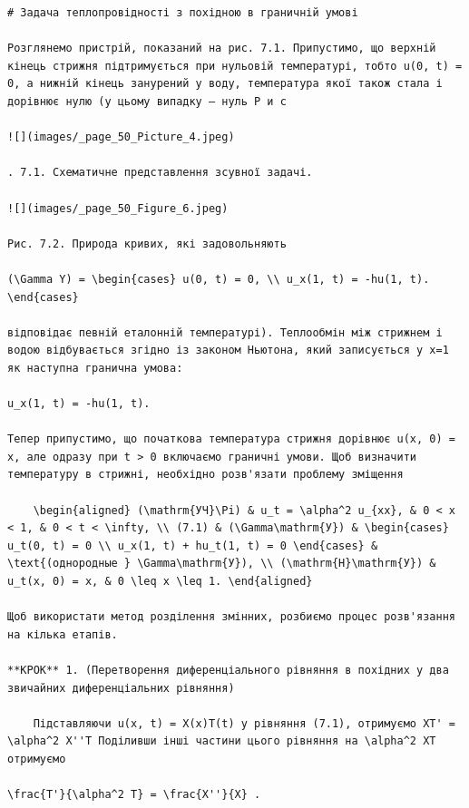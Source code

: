 \documentclass[
  ukrainian,
]{article}
\begin{document}
\begin{verbatim}
# Задача теплопровідності з похідною в граничній умові

Розглянемо пристрій, показаний на рис. 7.1. Припустимо, що верхній кінець стрижня підтримується при нульовій температурі, тобто u(0, t) = 0, а нижній кінець занурений у воду, температура якої також стала і дорівнює нулю (у цьому випадку — нуль Р и с

![](images/_page_50_Picture_4.jpeg)

. 7.1. Схематичне представлення зсувної задачі.

![](images/_page_50_Figure_6.jpeg)

Рис. 7.2. Природа кривих, які задовольняють

(\Gamma Y) = \begin{cases} u(0, t) = 0, \\ u_x(1, t) = -hu(1, t). \end{cases}

відповідає певній еталонній температурі). Теплообмін між стрижнем і водою відбувається згідно із законом Ньютона, який записується у x=1 як наступна гранична умова:

u_x(1, t) = -hu(1, t).

Тепер припустимо, що початкова температура стрижня дорівнює u(x, 0) = x, але одразу при t > 0 включаємо граничні умови. Щоб визначити температуру в стрижні, необхідно розв'язати проблему зміщення

    \begin{aligned} (\mathrm{УЧ}\Pi) & u_t = \alpha^2 u_{xx}, & 0 < x < 1, & 0 < t < \infty, \\ (7.1) & (\Gamma\mathrm{У}) & \begin{cases} u_t(0, t) = 0 \\ u_x(1, t) + hu_t(1, t) = 0 \end{cases} & \text{(однородные } \Gamma\mathrm{У}), \\ (\mathrm{H}\mathrm{У}) & u_t(x, 0) = x, & 0 \leq x \leq 1. \end{aligned}

Щоб використати метод розділення змінних, розбиємо процес розв'язання на кілька етапів.

**КРОК** 1. (Перетворення диференціального рівняння в похідних у два звичайних диференціальних рівняння)

    Підставляючи u(x, t) = X(x)T(t) у рівняння (7.1), отримуємо XT' = \alpha^2 X''T Поділивши інші частини цього рівняння на \alpha^2 XT отримуємо

\frac{T'}{\alpha^2 T} = \frac{X''}{X} .


\end{verbatim}
\end{document}
